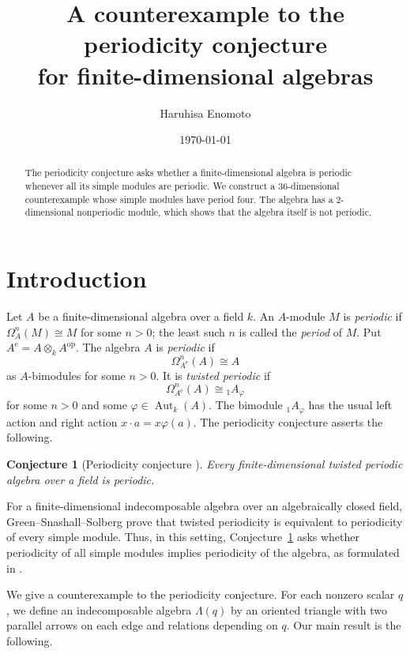 \documentclass[a4paper,reqno,10pt]{amsart}
\title[The periodicity conjecture]
{A counterexample to the periodicity conjecture\\
for finite-dimensional algebras}
\author[H.\ Enomoto]{Haruhisa Enomoto}
\date{\today}
\newtheorem{conjecture}[theorem]{Conjecture}
\theoremstyle{definition}
\numberwithin{equation}{section}
\newcommand{\kfield}{k}
\newcommand{\Aut}{\operatorname{Aut}}
\newcommand{\op}{\mathrm{op}}
\newcommand{\ee}{\mathrm e}
\begin{document}
\begin{abstract}
The periodicity conjecture asks whether a finite-dimensional algebra is
periodic whenever all its simple modules are periodic. We construct a
$36$-dimensional counterexample whose simple modules have period four.
The algebra has a $2$-dimensional nonperiodic module, which shows that
the algebra itself is not periodic.
\end{abstract}

\maketitle
\tableofcontents
\enlargethispage{5pt}

\section{Introduction}
\label{sec:introduction}

Let $A$ be a finite-dimensional algebra over a field $\kfield$. An
$A$-module $M$ is \emph{periodic} if $\Omega_A^n(M)\cong M$ for some $n>0$;
the least such $n$ is called the \emph{period} of $M$. Put
$A^{\ee}=A\otimes_\kfield A^{\op}$. The algebra $A$ is \emph{periodic} if
\[
 \Omega_{A^{\ee}}^n(A)\cong A
\]
as $A$-bimodules for some $n>0$. It is \emph{twisted periodic} if
\[
 \Omega_{A^{\ee}}^n(A)\cong {}_1A_\varphi
\]
for some $n>0$ and some $\varphi\in\Aut_\kfield(A)$. The bimodule
${}_1A_\varphi$ has the usual left action and right action
$x\cdot a=x\varphi(a)$. The periodicity conjecture asserts the following.

\begin{conjecture}[Periodicity conjecture {\cite[Introduction]{ChanDarpoIyamaMarczinzik}}]
\label{conj:periodicity}
Every finite-dimensional twisted periodic algebra over a field is periodic.
\end{conjecture}

For a finite-dimensional indecomposable algebra over an algebraically closed
field, Green--Snashall--Solberg \cite[Theorem~1.4]{GreenSnashallSolberg}
prove that twisted periodicity is equivalent to periodicity of every simple
module. Thus, in this setting, Conjecture~\ref{conj:periodicity} asks whether
periodicity of all simple modules implies periodicity of the algebra,
as formulated in \cite[p.~283]{ErdmannSkowronski}.

We give a counterexample to the periodicity conjecture. For each nonzero scalar $q$, we define an indecomposable algebra
$\Lambda(q)$ by an oriented triangle with two parallel arrows on each edge
and relations depending on $q$. Our main result is the following.
\end{document}
